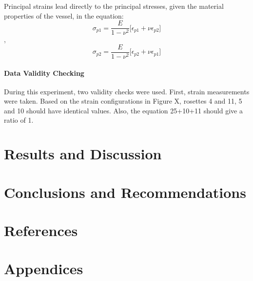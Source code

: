 \documentclass{article}
\begin{document}
Principal strains lead directly to the principal stresses, given the material properties of the vessel,
in the equation:
$$ \sigma_{p1} = \frac{E}{1-\nu^2} \big[ \epsilon_{p1} + \nu\epsilon_{p2} \big] $$,
$$ \sigma_{p2} = \frac{E}{1-\nu^2} \big[ \epsilon_{p2} + \nu\epsilon_{p1} \big] $$
	
	
\paragraph {Data Validity Checking} 
During this experiment, two validity checks were used. First, strain measurements were taken. Based on the
strain configurations in Figure X, rosettes 4 and 11, 5 and 10 should have identical values. Also, the 
equation 25+10+11 should give a ratio of 1. 


\section{Results and Discussion}\label{conclusions}


\section {Conclusions and Recommendations}



\section {References}


\section {Appendices}
\end{document}
